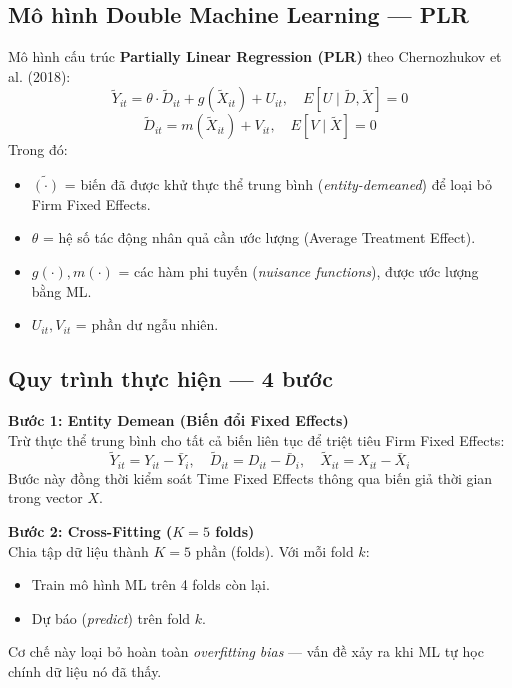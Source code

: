 \documentclass[12pt,a4paper]{article}
\begin{document}
\subsection{Mô hình Double Machine Learning --- PLR}
Mô hình cấu trúc \textbf{Partially Linear Regression (PLR)} theo Chernozhukov et al. (2018):
\begin{equation}
\tilde{Y}_{it} = \theta \cdot \tilde{D}_{it} + g(\tilde{X}_{it}) + U_{it}, \quad E[U \mid \tilde{D}, \tilde{X}] = 0
\end{equation}
\begin{equation}
\tilde{D}_{it} = m(\tilde{X}_{it}) + V_{it}, \quad E[V \mid \tilde{X}] = 0
\end{equation}
Trong đó:
\begin{itemize}
    \item $\tilde{(\cdot)}$ = biến đã được khử thực thể trung bình (\textit{entity-demeaned}) để loại bỏ Firm Fixed Effects.
    \item $\theta$ = hệ số tác động nhân quả cần ước lượng (Average Treatment Effect).
    \item $g(\cdot), m(\cdot)$ = các hàm phi tuyến (\textit{nuisance functions}), được ước lượng bằng ML.
    \item $U_{it}, V_{it}$ = phần dư ngẫu nhiên.
\end{itemize}

\subsection{Quy trình thực hiện --- 4 bước}
\textbf{Bước 1: Entity Demean (Biến đổi Fixed Effects)} \\
Trừ thực thể trung bình cho tất cả biến liên tục để triệt tiêu Firm Fixed Effects:
\begin{equation}
\tilde{Y}_{it} = Y_{it} - \bar{Y}_i, \quad \tilde{D}_{it} = D_{it} - \bar{D}_i, \quad \tilde{X}_{it} = X_{it} - \bar{X}_i
\end{equation}
Bước này đồng thời kiểm soát Time Fixed Effects thông qua biến giả thời gian trong vector $X$.

\noindent\textbf{Bước 2: Cross-Fitting ($K = 5$ folds)} \\
Chia tập dữ liệu thành $K = 5$ phần (folds). Với mỗi fold $k$:
\begin{itemize}
    \item Train mô hình ML trên 4 folds còn lại.
    \item Dự báo (\textit{predict}) trên fold $k$.
\end{itemize}
Cơ chế này loại bỏ hoàn toàn \textit{overfitting bias} --- vấn đề xảy ra khi ML tự học chính dữ liệu nó đã thấy.
\end{document}
